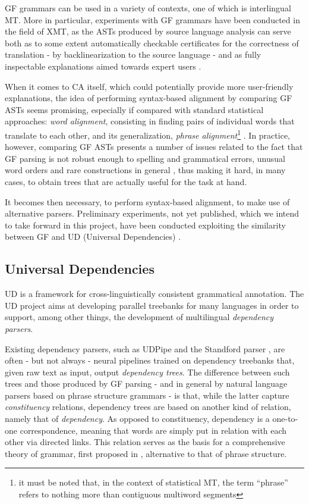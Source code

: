\documentclass{article}
\begin{document}
GF grammars can be used in a variety of contexts, one of which is interlingual MT. More in particular, experiments with GF grammars have been conducted in the field of XMT, as the ASTs produced by source language analysis can serve both as to some extent automatically checkable certificates for the correctness of translation - by backlinearization to the source language - and as fully inspectable explanations aimed towards expert users \cite{rantaxmt}.

When it comes to CA itself, which could potentially provide more user-friendly explanations, the idea of performing syntax-based alignment by comparing GF ASTs seems promising, especially if compared with standard statistical approaches: \textit{word alignment}, consisting in finding pairs of individual words that translate to each other, and its generalization, \textit{phrase alignment}\footnote{it must be noted that, in the context of statistical MT, the term ``phrase'' refers to nothing more than contiguous multiword segments} \cite{ibm}.
In practice, however, comparing GF ASTs presents a number of issues related to the fact that GF parsing is not robust enough to spelling and grammatical errors, unusual word orders and rare constructions in general \cite{rantaxmt}, thus making it hard, in many cases, to obtain trees that are actually useful for the task at hand.

It becomes then necessary, to perform syntax-based alignment, to make use of alternative parsers. Preliminary experiments, not yet published, which we intend to take forward in this project, have been conducted exploiting the similarity between GF and UD (Universal Dependencies) \cite{gfud, udgf}.

\subsection{Universal Dependencies} \label{ud}
UD is a framework for cross-linguistically consistent grammatical annotation. 
The UD project aims at developing parallel treebanks for many languages in order to support, among other things, the development of multilingual \textit{dependency parsers}.

Existing dependency parsers, such as UDPipe \cite{udpipe1} and the Standford parser \cite{standford}, are often - but not always \cite{rasp} - neural pipelines trained on dependency treebanks that, given raw text as input, output \textit{dependency trees}.
The difference between such trees and those produced by GF parsing - and in general by natural language parsers based on phrase structure grammars - is that, while the latter capture \textit{constituency} relations, dependency trees are based on another kind of relation, namely that of \textit{dependency}.
As opposed to constituency, dependency is a one-to-one correspondence, meaning that words are simply put in relation with each other via directed links. 
This relation serves as the basis for a comprehensive theory of grammar, first proposed in \cite{dg}, alternative to that of phrase structure.
\end{document}
